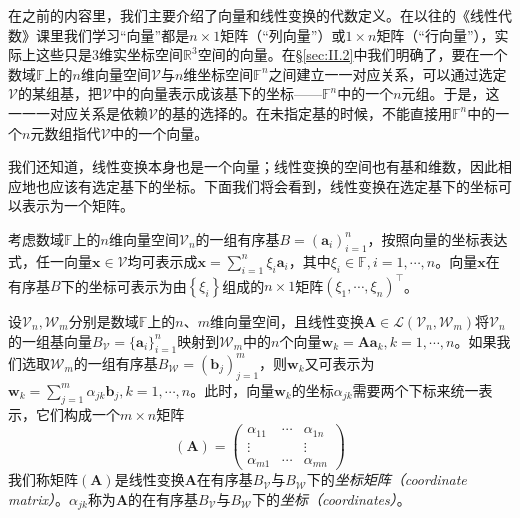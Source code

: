 \documentclass[main.tex]{subfiles}
\begin{document}
在之前的内容里，我们主要介绍了向量和线性变换的代数定义。在以往的《线性代数》课里我们学习“向量”都是$n\times 1$矩阵（“列向量”）或$1\times n$矩阵（“行向量”），实际上这些只是3维实坐标空间$\mathbb{R}^3$空间的向量。在\S\ref{sec:II.2}中我们明确了，要在一个数域$\mathbb{F}$上的$n$维向量空间$\mathcal{V}$与$n$维坐标空间$\mathbb{F}^n$之间建立一一对应关系，可以通过选定$\mathcal{V}$的某组基，把$\mathcal{V}$中的向量表示成该基下的坐标——$\mathbb{F}^n$中的一个$n$元组。于是，这一一一对应关系是依赖$\mathcal{V}$的基的选择的。在未指定基的时候，不能直接用$\mathbb{F}^n$中的一个$n$元数组指代$\mathcal{V}$中的一个向量。

我们还知道，线性变换本身也是一个向量；线性变换的空间也有基和维数，因此相应地也应该有选定基下的坐标。下面我们将会看到，线性变换在选定基下的坐标可以表示为一个矩阵\cite[\S7.3“3”]{周胜林2012线性代数}。

考虑数域$\mathbb{F}$上的$n$维向量空间$\mathcal{V}_n$的一组有序基$B=\left(\mathbf{a}_i\right)_{i=1}^n$，按照向量的坐标表达式，任一向量$\mathbf{x}\in\mathcal{V}$均可表示成$\mathbf{x}=\sum_{i=1}^n\xi_i\mathbf{a}_i$，其中$\xi_i\in\mathbb{F},i=1,\cdots,n$。向量$\mathbf{x}$在有序基$B$下的坐标可表示为由$\left\{\xi_i\right\}$组成的$n\times 1$矩阵$\left(\xi_1,\cdots,\xi_n\right)^\intercal$。

设$\mathcal{V}_n,\mathcal{W}_m$分别是数域$\mathbb{F}$上的$n$、$m$维向量空间，且线性变换$\mathbf{A}\in\mathcal{L}\left(\mathcal{V}_n,\mathcal{W}_m\right)$将$\mathcal{V}_n$的一组基向量$B_\mathcal{V}=\{\mathbf{a}_i\}_{i=1}^n$映射到$\mathcal{W}_m$中的$n$个向量$\mathbf{w}_k=\mathbf{Aa}_k,k=1,\cdots,n$。如果我们选取$\mathcal{W}_m$的一组有序基$B_\mathcal{W}=\left(\mathbf{b}_j\right)_{j=1}^m$，则$\mathbf{w}_k$又可表示为$\mathbf{w}_k=\sum_{j=1}^m\alpha_{jk}\mathbf{b}_j,k=1,\cdots,n$。此时，向量$\mathbf{w}_k$的坐标$\alpha_{jk}$需要两个下标来统一表示，它们构成一个$m\times n$矩阵
\[\left(\mathbf{A}\right)=\left(\begin{array}{ccc}\alpha_{11}&\cdots&\alpha_{1n}\\\vdots&&\vdots\\\alpha_{m1}&\cdots&\alpha_{mn}\end{array}\right)\]
我们称矩阵$\left(\mathbf{A}\right)$是线性变换$\mathbf{A}$在有序基$B_\mathcal{V}$与$B_\mathcal{W}$下的\emph{坐标矩阵（coordinate matrix）}。$\alpha_{jk}$称为$\mathbf{A}$的在有序基$B_\mathcal{V}$与$B_\mathcal{W}$下的\emph{坐标（coordinates）}。
\end{document}
